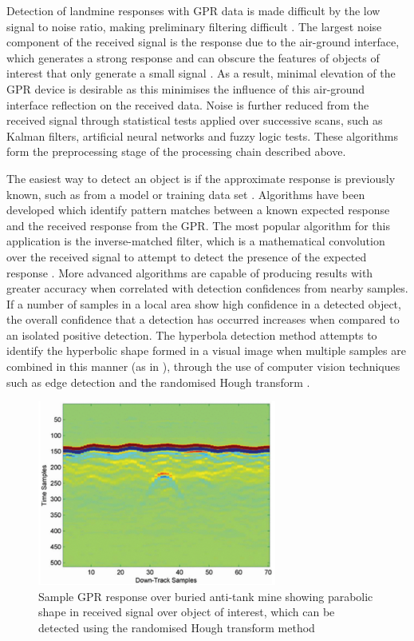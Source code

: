 \documentclass[main.tex]{subfiles}
\begin{document}
Detection of landmine responses with GPR data is made difficult by the low signal to noise ratio, making preliminary filtering difficult \parencite{shresta2003}. The largest noise component of the received signal is the response due to the air-ground interface, which generates a strong response and can obscure the features of objects of interest that only generate a small signal \parencite{Yarovoy2009}. As a result, minimal elevation of the GPR device is desirable as this minimises the influence of this air-ground interface reflection on the received data. Noise is further reduced from the received signal through statistical tests applied over successive scans, such as Kalman filters, artificial neural networks and fuzzy logic tests. These algorithms form the preprocessing stage of the processing chain described above.

The easiest way to detect an object is if the approximate response is previously known, such as from a model or training data set \parencite{Yarovoy2009}. Algorithms have been developed which identify pattern matches between a known expected response and the received response from the GPR. The most popular algorithm for this application is the inverse-matched filter, which is a mathematical convolution over the received signal to attempt to detect the presence of the expected response \parencite{Osumi1984}. More advanced algorithms are capable of producing results with greater accuracy when correlated with detection confidences from nearby samples. If a number of samples in a local area show high confidence in a detected object, the overall confidence that a detection has occurred increases when compared to an isolated positive detection. The hyperbola detection method attempts to identify the hyperbolic shape formed in a visual image when multiple samples are combined in this manner (as in ), through the use of computer vision techniques such as edge detection and the randomised Hough transform \parencite{Xu1990}.
\begin{figure}[ht]
\includegraphics[width=0.7\textwidth]{3-LiteratureReview/GPR-sample.png}
\centering
\caption[Sample GPR response over buried anti-tank mine]{Sample GPR response over buried anti-tank mine showing parabolic shape in received signal over object of interest, which can be detected using the randomised Hough transform method} 
\end{figure}
\end{document}
